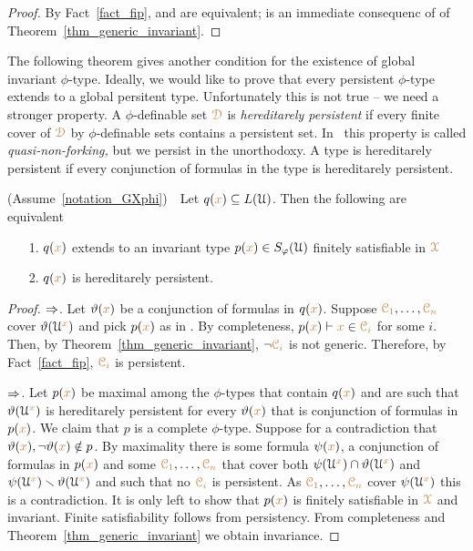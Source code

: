 \begin{proof}
  By Fact~\ref{fact_fip},  and  are equivalent;  is an immediate consequenc of  of Theorem~\ref{thm_generic_invariant}.
\end{proof}



The following theorem gives another condition for the  existence of global invariant $\phi$-type.
Ideally, we would like to prove that every persistent $\phi$-type extends to a global persitent type.
Unfortunately this is not true -- we need a stronger property.
A $\phi$-definable set ${\color{brown}\EuScript D}$ is \emph{hereditarely persistent\/} if every finite cover of ${\color{brown}\EuScript D}$ by $\phi$-definable sets contains a persistent set.
In~\cite{CK} this property is called \textit{quasi-non-forking,} but we persist in the unorthodoxy.
A type is hereditarely persistent if every conjunction of formulas in the type is hereditarely persistent.

\begin{theorem}\label{thm_generic_invariant2}
  (Assume~\ref{notation_GXphi})\ \  
  Let $q({\color{brown} x})\subseteq L(\EuScript U)$.
  Then the following are equivalent 
  \begin{itemize}
    \item[1.] $q({\color{brown} x})$ extends to an invariant type $p({\color{brown} x})\in S_\varphi(\EuScript U)$ finitely satisfiable in ${\color{brown}\EuScript X}$
    \item[2.] $q({\color{brown} x})$ is hereditarely persistent.
  \end{itemize}
\end{theorem}

\begin{proof}
  $\Rightarrow$.
  Let $\vartheta({\color{brown} x})$ be a conjunction of formulas in $q({\color{brown} x})$.
  Suppose ${\color{brown}\EuScript C_1},\dots,{\color{brown}\EuScript C_n}$ cover $\vartheta(\EuScript U^{\color{brown} x})$ and pick $p({\color{brown} x})$ as in .
  By completeness, $p({\color{brown} x})\vdash {\color{brown}x}\in{\color{brown}\EuScript C_i}$ for some $i$.
  Then, by Theorem~\ref{thm_generic_invariant}, $\neg{\color{brown}\EuScript C_i}$ is not generic.
  Therefore, by Fact~\ref{fact_fip}, ${\color{brown}\EuScript C_i}$ is persistent.

  $\Rightarrow$.
  Let $p({\color{brown} x})$ be maximal among the $\phi$-types that contain $q({\color{brown} x})$ and are such that $\vartheta(\EuScript U^{\color{brown} x})$ is hereditarely persistent for every $\vartheta({\color{brown} x})$ that is conjunction of formulas in $p({\color{brown} x})$.
  We claim that $p$ is a complete $\phi$-type.
  Suppose for a contradiction that $\vartheta({\color{brown} x}),\neg\vartheta({\color{brown} x})\notin p$.
  By maximality there is some formula $\psi({\color{brown} x})$, a conjunction of formulas in $p({\color{brown} x})$ and some ${\color{brown}\EuScript C_1},\dots,{\color{brown}\EuScript C_n}$ that cover both $\psi(\EuScript U^{\color{brown} x})\cap\vartheta(\EuScript U^{\color{brown} x})$ and $\psi(\EuScript U^{\color{brown} x})\smallsetminus\vartheta(\EuScript U^{\color{brown} x})$ and such that no ${\color{brown}\EuScript C_i}$ is persistent.
  As ${\color{brown}\EuScript C_1},\dots,{\color{brown}\EuScript C_n}$ cover $\psi(\EuScript U^{\color{brown} x})$ this is a contradiction.
  It is only left to show that $p({\color{brown} x})$ is finitely satisfiable in ${\color{brown}\EuScript X}$ and invariant.
  Finite satisfiability follows from persistency.
  From completeness and Theorem~\ref{thm_generic_invariant} we obtain invariance.
\end{proof}

